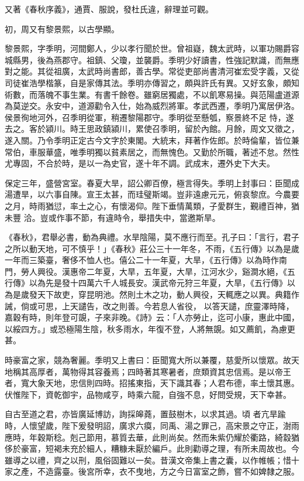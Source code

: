 \begin{pinyinscope}
 又著《春秋序義》，通賈、服說，發杜氏違，辭理並可觀。



 初，周又有黎景熙，以古學顯。



 黎景熙，字季明，河間鄭人，少以孝行聞於世。曾祖嶷，魏太武時，以軍功賜爵容城縣男，後為燕郡守。祖鎮、父瓊，並襲爵。季明少好讀書，性強記默識，而無應對之能。其從祖廣，太武時尚書郎，善古學。常從吏部尚書清河崔宏受字義，又從司徒崔浩學楷篆，自是家傳其法。季明亦傳習之，頗與許氏有異。又好玄象，頗知術數，而落魄不事生業。有書千餘卷。雖窮居獨處，不以飢寒易操。與范陽盧道源為莫逆交。永安中，道源勸令入仕，始為威烈將軍。孝武西遷，季明乃寓居伊洛。侯景徇地河外，召季明從軍，稍遷黎陽郡守。季明從至懸瓠，察景終不足
 恃，遂去之。客於潁川。時王思政鎮潁川，累使召季明，留於內館。月餘，周文又徵之，遂入關。乃令季明正定古今文字於東閣。大統末，拜著作佐郎。於時倫輩，皆位兼常伯，車服華盛，唯季明獨以貧素居之，而無愧色。又勤於所職，著述不怠。然性尤專固，不合於時，是以一為史官，遂十年不調。武成末，遷外史下大夫。



 保定三年，盛營宮室。春夏大旱，詔公卿百僚，極言得失。季明上封事曰：臣聞成湯遭旱，以六事自陳。宣王太甚，而珪璧斯竭。豈非遠慮元元，俯哀黎庶。今農要之月，時雨猶愆，率土之心，有懷渴仰。陛下垂情萬類，子愛群生，覲禮百神，猶未豐
 洽。豈或作事不節，有違時令，舉措失中，當邀斯旱。



 《春秋》，君舉必書，動為典禮。水旱陰陽，莫不應行而至。孔子曰：「言行，君子之所以動天地，可不慎乎！」《春秋》莊公三十一年冬，不雨，《五行傳》以為是歲一年而三築臺，奢侈不恤人也。僖公二十一年夏，大旱，《五行傳》以為時作南門，勞人興役。漢惠帝二年夏，大旱，五年夏，大旱，江河水少，谿澗水絕，《五行傳》以為先是發十四萬六千人城長安。漢武帝元狩三年夏，大旱，《五行傳》以為是歲發天下故吏，穿昆明池。然則土木之功，動人興役，天輒應之以異。典籍作誡，倘或可思，上天譴告，改之則善。今若息人省役，
 以答天譴，庶靈澤時降，嘉穀有時，則年登可覬，子來非晚。《詩》云：「人亦勞止，迄可小康，惠此中國，以綏四方。」或恐極陽生陰，秋多雨水，年復不登，人將無覬。如又薦飢，為慮更甚。



 時豪富之家，競為奢麗。季明又上書曰：臣聞寬大所以兼覆，慈愛所以懷眾。故天地稱其高厚者，萬物得其容養焉；四時著其寒暑者，庶類資其忠信焉。是以帝王者，寬大象天地，忠信則四時。招搖東指，天下識其春；人君布德，率土懷其惠。伏惟陛下，資乾御宇，品物咸亨，時乘六龍，自強不息，好問受規，天下幸甚。



 自古至道之君，亦皆廣延博訪，詢採皞蕘，置鼓樹木，以求其過。頃
 者亢旱踰時，人懷望歲，陛下爰發明詔，廣求六瘼，同禹、湯之罪己，高宋景之守正，澍雨應時，年穀斯稔。剋己節用，慕質去華，此則尚矣。然而朱紫仍耀於衢路，綺縠猶侈於豪富，短褐未充於細人，糟糠未厭於編戶。此則勸導之理，有所未周故也。今雖導之以禮，齊之以刑，風俗固難以一矣。昔漢文帝集上書之囊，以作帷帳；惜十家之產，不造露臺。後宮所幸，衣不曳地，方之今日富室之飾，嘗不如婢隸之服。




\end{pinyinscope}
